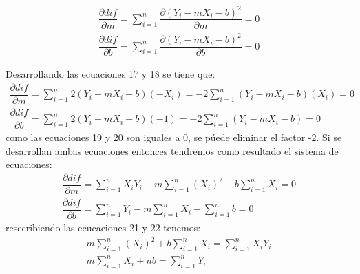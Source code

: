 \documentclass[12pt,letterpaper]{report}
\begin{document}
\begin{eqnarray}
 \dfrac{\partial dif}{\partial m}= \sum_{i=1}^{n}\dfrac{\partial (Y_{i}-mX_{i}-b)^{2}}{\partial m} = 0 \\
 \dfrac{\partial dif}{\partial b}= \sum_{i=1}^{n}\dfrac{\partial (Y_{i}-mX_{i}-b)^{2}}{\partial b} = 0
\end{eqnarray}

Desarrollando las ecuaciones 17 y 18 se tiene que:
\begin{eqnarray}
\dfrac{\partial dif}{\partial m}= \sum_{i=1}^{n} 2 (Y_{i}-mX_{i}-b)(-X_{i})= -2 \sum_{i=1}^{n}  (Y_{i}-mX_{i}-b)(X_{i})  = 0       \\
\dfrac{\partial dif}{\partial b}= \sum_{i=1}^{n} 2(Y_{i}-mX_{i}-b)(-1)= -2\sum_{i=1}^{n} (Y_{i}-mX_{i}-b)=0
\end{eqnarray}
como las ecuaciones 19 y 20 son iguales a 0, se púede eliminar el factor  -2. Si se desarrollan ambas ecuaciones entonces tendremos como resultado el sistema de ecuaciones:
\begin{eqnarray}
\dfrac{\partial dif}{\partial m} = \sum_{i=1}^{n}X_{i}Y_{i}-m\sum_{i=1}^{n}(X_{i})^{2} -b\sum_{i=1}^{n}X_{i}=0 \\
\dfrac{\partial dif}{\partial b}=\sum_{i=1}^{n}Y_{i}- m\sum_{i=1}^{n}X_{i}-\sum_{i=1}^{n} b=0
\end{eqnarray}
resecribiendo las ecucaciones 21 y 22 tenemos:
\begin{eqnarray}
m\sum_{i=1}^{n}(X_{i})^{2} +b\sum_{i=1}^{n}X_{i}=\sum_{i=1}^{n}X_{i}Y_{i} \\
m\sum_{i=1}^{n}X_{i}+ nb =\sum_{i=1}^{n}Y_{i}
\end{eqnarray}
\end{document}
